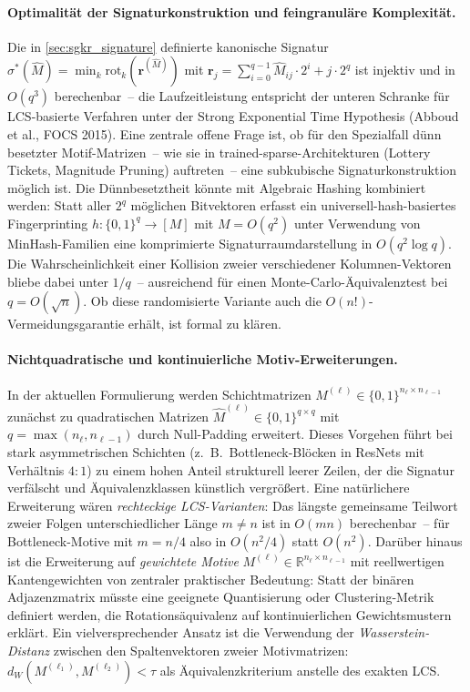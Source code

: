 \documentclass[12pt, a4paper, openany]{report}
\newcommand{\R}{\mathbb{R}}
\begin{document}
\paragraph{Optimalität der Signaturkonstruktion und feingranuläre Komplexität.}
Die in \cref{sec:sgkr_signature} definierte kanonische Signatur
$\sigma^*(\hat{M}) = \min_{k} \mathrm{rot}_k(\bm{r}^{(\hat{M})})$ mit
$\bm{r}_j = \sum_{i=0}^{q-1} \hat{M}_{ij}\cdot 2^i + j\cdot 2^q$
ist injektiv und in $O(q^3)$ berechenbar~-- die Laufzeitleistung entspricht
der unteren Schranke für LCS-basierte Verfahren unter der Strong Exponential
Time Hypothesis (Abboud et al., FOCS 2015).  Eine zentrale offene Frage ist,
ob für den Spezialfall dünn besetzter Motif-Matrizen~-- wie sie in
trained-sparse-Architekturen (Lottery Tickets, Magnitude Pruning) auftreten~--
eine subkubische Signaturkonstruktion möglich ist.  Die Dünnbesetztheit könnte
mit Algebraic Hashing kombiniert werden: Statt aller $2^q$ möglichen
Bitvektoren erfasst ein universell-hash-basiertes Fingerprinting
$h\colon \{0,1\}^q \to [M]$ mit $M = O(q^2)$ unter Verwendung von
MinHash-Familien eine komprimierte Signaturraumdarstellung in $O(q^2\log q)$.
Die Wahrscheinlichkeit einer Kollision zweier verschiedener Kolumnen-Vektoren
bliebe dabei unter $1/q$~-- ausreichend für einen Monte-Carlo-Äquivalenztest
bei $q = O(\sqrt{n})$.  Ob diese randomisierte Variante auch die
$O(n!)$-Vermeidungsgarantie erhält, ist formal zu klären.

\paragraph{Nichtquadratische und kontinuierliche Motiv-Erweiterungen.}
In der aktuellen Formulierung werden Schichtmatrizen $M^{(\ell)} \in
\{0,1\}^{n_\ell \times n_{\ell-1}}$ zunächst zu quadratischen Matrizen
$\hat{M}^{(\ell)} \in \{0,1\}^{q\times q}$ mit $q = \max(n_\ell, n_{\ell-1})$
durch Null-Padding erweitert.  Dieses Vorgehen führt bei stark asymmetrischen
Schichten (z.~B.\ Bottleneck-Blöcken in ResNets mit Verhältnis $4:1$) zu
einem hohen Anteil strukturell leerer Zeilen, der die Signatur verfälscht
und Äquivalenzklassen künstlich vergrößert.  Eine natürlichere Erweiterung
wären \emph{rechteckige LCS-Varianten}: Das längste gemeinsame Teilwort
zweier Folgen unterschiedlicher Länge $m \neq n$ ist in $O(mn)$ berechenbar~--
für Bottleneck-Motive mit $m = n/4$ also in $O(n^2/4)$ statt $O(n^2)$.
Darüber hinaus ist die Erweiterung auf \emph{gewichtete Motive}
$M^{(\ell)} \in \R^{n_\ell \times n_{\ell-1}}$ mit reellwertigen
Kantengewichten von zentraler praktischer Bedeutung: Statt der binären
Adjazenzmatrix müsste eine geeignete Quantisierung oder Clustering-Metrik
definiert werden, die Rotationsäquivalenz auf kontinuierlichen Gewichtsmustern
erklärt.  Ein vielversprechender Ansatz ist die Verwendung der
\emph{Wasserstein-Distanz} zwischen den Spaltenvektoren zweier
Motivmatrizen: $d_W(M^{(\ell_1)}, M^{(\ell_2)}) < \tau$ als
Äquivalenzkriterium anstelle des exakten LCS.
\end{document}
